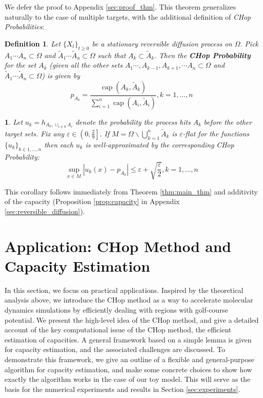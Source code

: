 \documentclass[english, aip, jcp, priprint, graphicx]{revtex4-1}
\newtheorem{definition}{Definition}
\theoremstyle{plain}
\theoremstyle{definition}
\theoremstyle{plain}
\newtheorem{cor}[thm]{\protect\corollaryname}
\providecommand{\corollaryname}{Corollary}
\begin{document}
We defer the proof to Appendix \ref{sec:proof_thm}. This theorem generalizes naturally to the case of multiple targets, with the additional definition of \textit{CHop Probabilities}:

\begin{definition}\label{chop_prob}
Let $\{X_t\}_{t\geq 0}$ be a stationary reversible diffusion process on $\Omega$.  Pick $A_1\cdots A_n \subset \Omega$ and $\tilde A_1\cdots \tilde A_n \subset \Omega$ such that $A_k \subset \tilde A_k$.  Then the \textbf{CHop Probability} for the set $A_k$ (given all the other sets $A_1\cdots, A_{k-1}, A_{k+1}, \cdots A_n \subset \Omega$ and $\tilde A_1\cdots \tilde A_n \subset \Omega$) is given by
\begin{equation*}
p_{A_k} = \frac{\ensuremath{\operatorname{cap}} (A_k, \tilde{A}_k)}{\sum_{i = 1}^n \ensuremath{\operatorname{cap}} (A_i, \tilde{A}_i)}, k=1,\dots, n
\end{equation*} 
\end{definition}

\begin{cor}\label{thm:main_cor} Let $u_k = h_{A_k,\cup_{i\neq k} A_i}$ denote the probability the process hits $A_k$ before the other target sets.  Fix any $\varepsilon \in \left( 0, \frac{2}{9} \right]$.  If $M = \Omega \backslash \bigcup_{k = 1}^n \tilde{A}_k $ is $\varepsilon$-flat for the functions $\{u_k\}_{k\in1,\dots, n}$ then each $u_k$ is well-approximated by the corresponding CHop Probability:
\[ \sup_{x \in M} \left| u_k (x) - p_{A_k} \right| \leqslant \varepsilon + \sqrt{\frac{\varepsilon}{2}}, k=1,\dots, n\]
\end{cor}

This corollary follows immediately from Theorem \ref{thm:main_thm} and additivity of the capacity (Proposition \ref{prop:capacity} in Appendix \ref{sec:reversible_diffusion}). 

\section{Application: CHop Method and Capacity Estimation}\label{sec:algorithm}

In this section, we focus on practical applications. Inspired by the theoretical analysis above, we introduce the CHop method as a way to accelerate molecular dynamics simulations by efficiently dealing with regions with golf-course potential. We present the high-level idea of the CHop method, and give a detailed account of the key computational issue of the CHop method, the efficient estimation of capacities. A general framework based on a simple lemma is given for capacity estimation, and the associated challenges are discussed. To demonstrate this framework, we give an outline of a flexible and general-purpose algorithm for capacity estimation, and make some concrete choices to show how exactly the algorithm works in the case of our toy model. This will serve as the basis for the numerical experiments and results in Section \ref{sec:experiments}.
\end{document}
